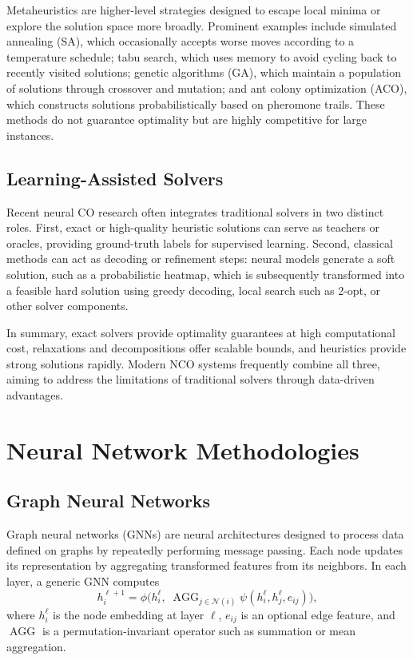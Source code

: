 Metaheuristics are higher-level strategies designed to escape local minima or explore the
solution space more broadly. Prominent examples include simulated annealing (SA), which
occasionally accepts worse moves according to a temperature schedule; tabu search, which uses
memory to avoid cycling back to recently visited solutions; genetic algorithms (GA), which
maintain a population of solutions through crossover and mutation; and ant colony optimization
(ACO), which constructs solutions probabilistically based on pheromone trails. These methods
do not guarantee optimality but are highly competitive for large instances.

\subsection{Learning-Assisted Solvers}
\label{subsec:learning-assisted-solvers}

Recent neural CO research often integrates traditional solvers in two distinct roles. First,
exact or high-quality heuristic solutions can serve as teachers or oracles, providing
ground-truth labels for supervised learning. Second, classical methods can act as decoding or
refinement steps: neural models generate a soft solution, such as a probabilistic heatmap,
which is subsequently transformed into a feasible hard solution using greedy decoding, local
search such as 2-opt, or other solver components.

In summary, exact solvers provide optimality guarantees at high computational cost,
relaxations and decompositions offer scalable bounds, and heuristics provide strong solutions
rapidly. Modern NCO systems frequently combine all three, aiming to address the limitations of
traditional solvers through data-driven advantages.

\section{Neural Network Methodologies}
\label{sec:neural-network-methodologies}

\subsection{Graph Neural Networks}
\label{subsec:gnn}

Graph neural networks (GNNs) are neural architectures designed to process data defined on
graphs by repeatedly performing message passing. Each node updates its representation by
aggregating transformed features from its neighbors. In each layer, a generic GNN computes
\[
h_i^{\ell+1}=\phi\Big(h_i^{\ell},\;
\operatorname{AGG}_{j\in\mathcal{N}(i)}\psi(h_i^{\ell},h_j^{\ell},e_{ij})\Big),
\]
where $h_i^{\ell}$ is the node embedding at layer $\ell$, $e_{ij}$ is an optional edge
feature, and $\operatorname{AGG}$ is a permutation-invariant operator such as summation or
mean aggregation.


